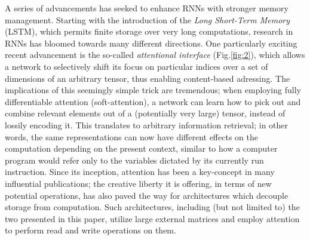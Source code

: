 \documentclass[]{article}
\begin{document}
A series of advancements has seeked to enhance RNNs with stronger memory management. Starting with the introduction of the \textit{Long Short-Term Memory} (LSTM)\cite{Hochreiter:1997:LSM:1246443.1246450,Gers99learningto}, which permits finite storage over very long computations, research in RNNs has bloomed towards many different directions. One particularly exciting recent advancement is the so-called \textit{attentional interface}\cite{NIPS2014_5542,Bahdanau} (Fig.\ref{fig:2}), which allows a network to selectively shift its focus on particular indices over a set of dimensions of an arbitrary tensor, thus enabling content-based adressing. The implications of this seemingly simple trick are tremendous; when employing fully differentiable attention (soft-attention), a network can learn how to pick out and combine relevant elements out of a (potentially very large) tensor, instead of lossily encoding it. This translates to arbitrary information retrieval; in other words, the same representations can now have different effects on the computation depending on the present context, similar to how a computer program would refer only to the variables dictated by its currently run instruction\cite{NIPS2014_5346}. Since its inception, attention has been a key-concept in many influential publications; the creative liberty it is offering, in terms of new potential operations, has also paved the way for architectures which decouple storage from computation. Such architectures, including (but not limited to) the two presented in this paper, utilize large external matrices and employ attention to perform read and write operations on them.
\end{document}
